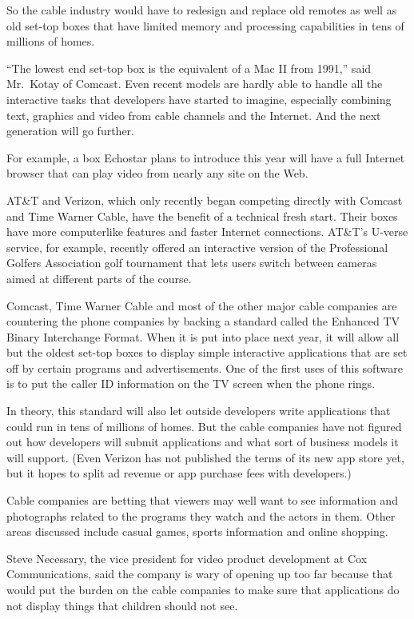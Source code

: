 ﻿\documentclass[12pt]{article}
\begin{document}
So the cable industry would have to redesign and replace old remotes as well as old set-top boxes
that have limited memory and processing capabilities in tens of millions of homes.

``The lowest end set-top box is the equivalent of a Mac II from 1991,'' said Mr.~Kotay of Comcast.
Even recent models are hardly able to handle all the interactive tasks that developers have started
to imagine, especially combining text, graphics and video from cable channels and the Internet. And
the next generation will go further.

For example, a box Echostar plans to introduce this year will have a full Internet browser that can
play video from nearly any site on the Web.

AT\&T and Verizon, which only recently began competing directly with Comcast and Time Warner Cable,
have the benefit of a technical fresh start. Their boxes have more computerlike features and faster
Internet connections. AT\&T's U-verse service, for example, recently offered an interactive version
of the Professional Golfers Association golf tournament that lets users switch between cameras aimed
at different parts of the course.

Comcast, Time Warner Cable and most of the other major cable companies are countering the phone
companies by backing a standard called the Enhanced TV Binary Interchange Format. When it is put
into place next year, it will allow all but the oldest set-top boxes to display simple interactive
applications that are set off by certain programs and advertisements. One of the first uses of this
software is to put the caller ID information on the TV screen when the phone rings.

In theory, this standard will also let outside developers write applications that could run in tens
of millions of homes. But the cable companies have not figured out how developers will submit
applications and what sort of business models it will support. (Even Verizon has not published the
terms of its new app store yet, but it hopes to split ad revenue or app purchase fees with
developers.)

Cable companies are betting that viewers may well want to see information and photographs related to
the programs they watch and the actors in them. Other areas discussed include casual games, sports
information and online shopping.

Steve Necessary, the vice president for video product development at Cox Communications, said the
company is wary of opening up too far because that would put the burden on the cable companies to
make sure that applications do not display things that children should not see.
\end{document}
